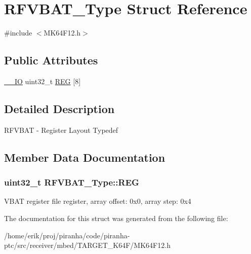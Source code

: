 \hypertarget{structRFVBAT__Type}{}\section{R\+F\+V\+B\+A\+T\+\_\+\+Type Struct Reference}
\label{structRFVBAT__Type}


{\ttfamily \#include $<$M\+K64\+F12.\+h$>$}

\subsection*{Public Attributes}
\begin{DoxyCompactItemize}
\item 
\hyperlink{core__sc300_8h_aec43007d9998a0a0e01faede4133d6be}{\+\_\+\+\_\+\+IO} uint32\+\_\+t \hyperlink{structRFVBAT__Type_a073245fe0f32ff9f9f3ed11ab5c1526b}{R\+EG} \mbox{[}8\mbox{]}
\end{DoxyCompactItemize}


\subsection{Detailed Description}
R\+F\+V\+B\+AT -\/ Register Layout Typedef 

\subsection{Member Data Documentation}
\subsubsection[{\texorpdfstring{R\+EG}{REG}}]{ uint32\+\_\+t R\+F\+V\+B\+A\+T\+\_\+\+Type\+::\+R\+EG}\hypertarget{structRFVBAT__Type_a073245fe0f32ff9f9f3ed11ab5c1526b}{}\label{structRFVBAT__Type_a073245fe0f32ff9f9f3ed11ab5c1526b}
V\+B\+AT register file register, array offset\+: 0x0, array step\+: 0x4 

The documentation for this struct was generated from the following file\+:\begin{DoxyCompactItemize}
\item 
/home/erik/proj/piranha/code/piranha-\/ptc/src/receiver/mbed/\+T\+A\+R\+G\+E\+T\+\_\+\+K64\+F/M\+K64\+F12.\+h\end{DoxyCompactItemize}
